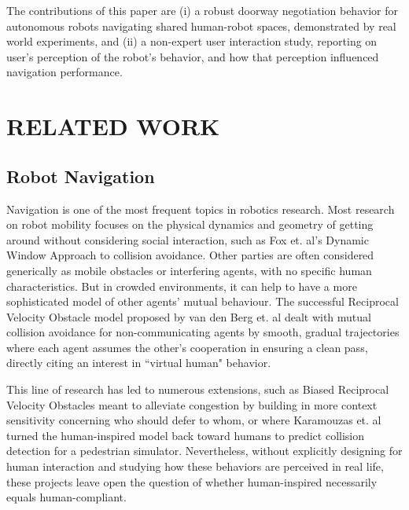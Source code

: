 \documentclass[letterpaper, 10 pt, conference]{ieeeconf}  %
\begin{document}
The contributions of this paper are (i) a robust doorway negotiation behavior for autonomous robots navigating shared human-robot spaces, demonstrated by real world experiments, and (ii) a non-expert user interaction study, reporting on user's perception of the robot’s behavior, and how that perception influenced navigation performance.

\section{RELATED WORK}


\subsection{Robot Navigation}

Navigation is one of the most frequent topics in robotics research. Most research on robot mobility focuses on the physical dynamics and geometry of getting around without considering social interaction, such as Fox et. al's Dynamic Window Approach to collision avoidance\cite{c2}. Other parties are often considered generically as mobile obstacles or interfering agents, with no specific human characteristics. But in crowded environments, it can help to have a more sophisticated model of other agents' mutual behaviour. The successful Reciprocal Velocity Obstacle model proposed by van den Berg et. al\cite{c3} dealt with mutual collision avoidance for non-communicating agents by smooth, gradual trajectories where each agent assumes the other’s cooperation in ensuring a clean pass, directly citing an interest in ``virtual human" behavior. 

This line of research has led to numerous extensions, such as Biased Reciprocal Velocity Obstacles\cite{c4} meant to alleviate congestion by building in more context sensitivity concerning who should defer to whom, or where Karamouzas et. al\cite{c5} turned the human-inspired model back toward humans to predict collision detection for a pedestrian simulator. Nevertheless, without explicitly designing for human interaction and studying how these behaviors are perceived in real life, these projects leave open the question of whether human-inspired necessarily equals human-compliant.
\end{document}

